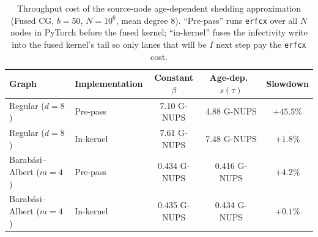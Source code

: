 \begin{table}[H]
\caption{Throughput cost of the source-node age-dependent shedding approximation (Fused CG, $b=50$, $N=10^6$, mean degree 8). ``Pre-pass'' runs \texttt{erfcx} over all $N$ nodes in PyTorch before the fused kernel; ``in-kernel'' fuses the infectivity write into the fused kernel's tail so only lanes that will be $I$ next step pay the \texttt{erfcx} cost.}
\label{tab:agedep_overhead}
\centering
\begin{tabular*}{\linewidth}{@{}llccc@{}}
\toprule
\textbf{Graph} & \textbf{Implementation} & \textbf{Constant $\beta$} & \textbf{Age-dep.\ $s(\tau)$} & \textbf{Slowdown} \\
\midrule
Regular ($d=8$)     & Pre-pass   & 7.10 G-NUPS & 4.88 G-NUPS & $+45.5\%$ \\
Regular ($d=8$)     & In-kernel  & 7.61 G-NUPS & 7.48 G-NUPS & $+1.8\%$  \\
\midrule
Barab\'{a}si--Albert ($m=4$) & Pre-pass   & 0.434 G-NUPS & 0.416 G-NUPS & $+4.2\%$ \\
Barab\'{a}si--Albert ($m=4$) & In-kernel  & 0.435 G-NUPS & 0.434 G-NUPS & $+0.1\%$ \\
\bottomrule
\end{tabular*}
\end{table}


